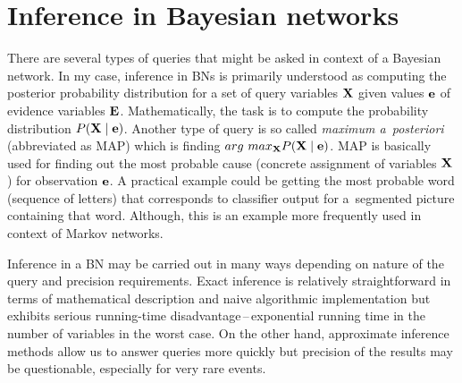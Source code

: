 \documentclass[english,cover]{fitthesis} %
\newcommand{\term}[1]{\emph{#1}}           %
\newcommand{\vars}[1]{{\bold{#1}}}         %
\begin{document}
\section{Inference in Bayesian networks}
There are several types of queries that might be asked in context of a Bayesian network. In my case, inference in BNs is primarily understood as computing the posterior probability distribution for a set of query variables $\vars{X}$ given values $\vars{e}$ of evidence variables $\vars{E}$. Mathematically, the task is to compute the probability distribution $P(\vars{X} \mid \vars{e})$. Another type of query is so called \term{maximum a~posteriori} (abbreviated as MAP) which is finding $arg\ max_\vars{X} P(\vars{X} \mid \vars{e})$. MAP is basically used for finding out the most probable cause (concrete assignment of variables $\vars{X}$) for observation $\vars{e}$. A practical example could be getting the most probable word (sequence of letters) that corresponds to classifier output for a~segmented picture containing that word. Although, this is an example more frequently used in context of Markov networks.

Inference in a BN may be carried out in many ways depending on nature of the query and precision requirements. Exact inference is relatively straightforward in terms of mathematical description and naive algorithmic implementation but exhibits serious running-time disadvantage\,--\,exponential running time in the number of variables in the worst case. On the other hand, approximate inference methods allow us to answer queries more quickly but precision of the results may be questionable, especially for very rare events.
\end{document}
